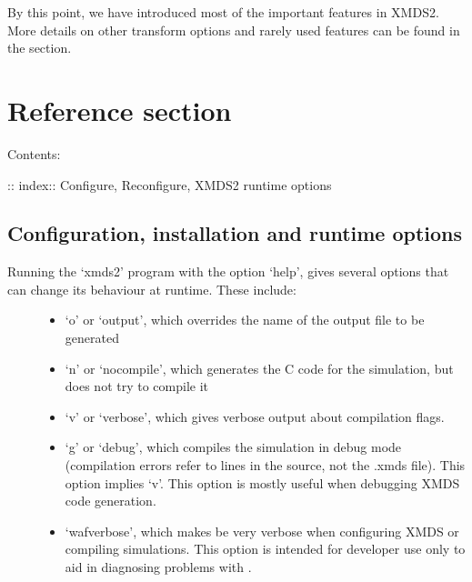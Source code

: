 \documentclass[letterpaper,10pt,english]{sphinxmanual}
\begin{document}
\sphinxAtStartPar
By this point, we have introduced most of the important features in XMDS2.  More details on other transform options and rarely used features can be found in the {\hyperref[\detokenize{advanced_topics:advancedtopics}]{}} section.


\chapter{Reference section}
\label{\detokenize{reference_index:reference-section}}\label{\detokenize{reference_index::doc}}
\sphinxAtStartPar
Contents:

\sphinxAtStartPar
:: index:: Configure, Reconfigure, XMDS2 runtime options


\section{Configuration, installation and runtime options}
\label{\detokenize{reference_installation_and_configuration:configuration-installation-and-runtime-options}}\label{\detokenize{reference_installation_and_configuration:referenceconfigurationinstallationruntime}}\label{\detokenize{reference_installation_and_configuration::doc}}\begin{description}
\item[{Running the ‘xmds2’ program with the option ‘\textendash{}help’, gives several options that can change its behaviour at runtime.  These include:}] \leavevmode\begin{itemize}
\item {} 
\sphinxAtStartPar
‘\sphinxhyphen{}o’ or ‘\textendash{}output’, which overrides the name of the output file to be generated

\item {} 
\sphinxAtStartPar
‘\sphinxhyphen{}n’ or ‘\textendash{}no\sphinxhyphen{}compile’, which generates the C code for the simulation, but does not try to compile it

\item {} 
\sphinxAtStartPar
‘\sphinxhyphen{}v’ or ‘\textendash{}verbose’, which gives verbose output about compilation flags.

\item {} 
\sphinxAtStartPar
‘\sphinxhyphen{}g’ or ‘\textendash{}debug’, which compiles the simulation in debug mode (compilation errors refer to lines in the source, not the .xmds file). This option implies ‘\sphinxhyphen{}v’. This option is mostly useful when debugging XMDS code generation.

\item {} 
\sphinxAtStartPar
‘\textendash{}waf\sphinxhyphen{}verbose’, which makes  be very verbose when configuring XMDS or compiling simulations.  This option is intended for developer use only to aid in diagnosing problems with .

\end{itemize}

\end{description}
\end{document}
